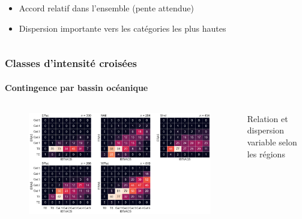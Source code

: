 \documentclass[aspectratio=169, usepdftitle=false, xcolor={dvipsnames}, 9pt,table]{beamer}
\begin{document}
\begin{frame}[t]
\begin{columns}
\begin{column}{0.5\textwidth}
\begin{examples}[Méthodologie]
            \end{examples}
            \vspace{2em}
            \begin{block}
               \begin{itemize}
                    \item Accord relatif dans l'ensemble (pente attendue)
                    \item \alert{Dispersion importante} vers les catégories les plus hautes
               \end{itemize} 
            \end{block}
        \end{column}
    \end{columns} 
\end{frame}

\begin{frame}[t]
    \frametitle{Classes d'intensité croisées}
    \framesubtitle{Contingence par bassin océanique}
    \begin{columns}
        \begin{column}{0.85\textwidth}
            \begin{figure}
                \centering
                \includegraphics[width=\textwidth]{Figures/Annexes/crosstable_region.png}
            \end{figure}
        \end{column}
        \begin{column}{0.15\textwidth}
            \scriptsize
            \begin{block}
               Relation et dispersion variable selon les régions 
            \end{block}
        \end{column}
    \end{columns}
\end{frame}
\end{document}
